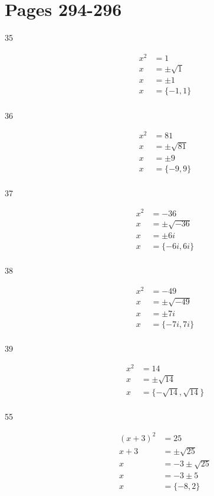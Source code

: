 \documentclass[fleqn,addpoints]{exam}
\begin{document}
\section{Pages 294-296}
\begin{description}

\item[35]
\begin{align*}
  x^2 &= 1 \\
  x &= \pm \sqrt{1} \\
  x &= \pm 1 \\
  x &= \{ -1, 1 \} \\
\end{align*}

\item[36]
\begin{align*}
  x^2 &= 81 \\
  x &= \pm \sqrt{81} \\
  x &= \pm 9 \\
  x &= \{ -9, 9 \} \\
\end{align*}

\item[37]
\begin{align*}
  x^2 &= -36 \\
  x &= \pm \sqrt{-36} \\
  x &= \pm 6i \\
  x &= \{ -6i, 6i \} \\
\end{align*}

\item[38]
\begin{align*}
  x^2 &= -49 \\
  x &= \pm \sqrt{-49} \\
  x &= \pm 7i \\
  x &= \{ -7i, 7i \} \\
\end{align*}

\item[39]
\begin{align*}
  x^2 &= 14 \\
  x &= \pm \sqrt{14} \\
  x &= \{ -\sqrt{14}, \sqrt{14} \} \\
\end{align*}

\item[55]
\begin{align*}
  (x+3)^2 &= 25 \\
  x+3 &= \pm \sqrt{25} \\
  x &= -3 \pm \sqrt{25} \\
  x &= -3 \pm 5 \\
  x &= \{ -8, 2 \} \\
\end{align*}


\end{description}
\end{document}
